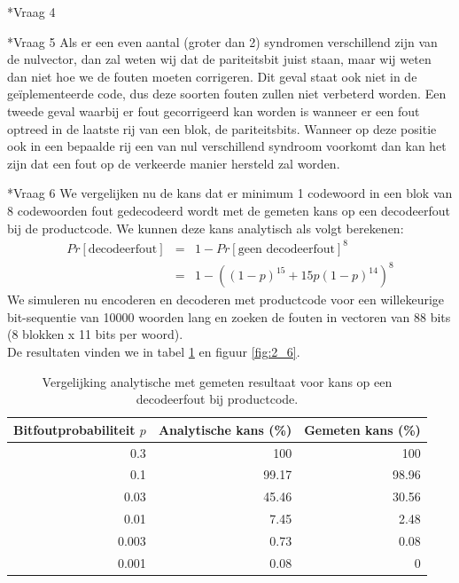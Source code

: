 \documentclass[]{article}
\begin{document}
\begin{section}
\begin{subsection}
    \end{subsection}

    \begin{subsection}*{Vraag 4} %
    \end{subsection}

    \begin{subsection}*{Vraag 5} %
    	Als er een even aantal (groter dan 2) syndromen verschillend zijn van de nulvector,
    	dan zal weten wij dat de pariteitsbit juist staan, maar wij weten dan niet hoe we
    	de fouten moeten corrigeren. Dit geval staat ook niet in de ge\"iplementeerde code,
    	dus deze soorten fouten zullen niet verbeterd worden.
    	Een tweede geval waarbij er fout gecorrigeerd kan worden is wanneer er een fout
    	optreed in de laatste rij van een blok, de pariteitsbits. Wanneer op deze positie
    	ook in een bepaalde rij een van nul verschillend syndroom voorkomt dan kan het zijn
    	dat een fout op de verkeerde manier hersteld zal worden.
    \end{subsection}

    \begin{subsection}*{Vraag 6} %
   	We vergelijken nu de kans dat er minimum 1 codewoord in een blok van 8 codewoorden fout gedecodeerd wordt met de gemeten kans op een decodeerfout bij de productcode.
	We kunnen deze kans analytisch als volgt berekenen:
    	\begin{eqnarray*}
		Pr[\text{decodeerfout}]&=& 1 - Pr[\text{geen decodeerfout}]^8 \\ 
						&=& 1 - ((1-p)^{15} + 15p(1-p)^{14})^8
	\end{eqnarray*}
	We simuleren nu encoderen en decoderen met productcode voor een willekeurige bit-sequentie van 10000 woorden lang en zoeken de fouten in vectoren van 88 bits (8 blokken x 11 bits per woord). \\ De resultaten vinden we in tabel \ref{tab:2_6} en figuur \ref{fig:2_6}.
	    	\begin{table}[h]
    		\centering	
    		\begin{tabular}{r|r|r}
    		Bitfoutprobabiliteit $p$ & Analytische kans (\%) & Gemeten kans (\%)\\
    		\hline
    		0.3 & 100 & 100 \\
        		0.1 & 99.17 & 98.96\\
    		0.03 & 45.46 & 30.56\\
    		0.01 & 7.45& 2.48\\
    		0.003 & 0.73 & 0.08 \\
    		0.001 & 0.08 & 0\\	
    		\end{tabular}
    		\caption{Vergelijking analytische met gemeten resultaat voor kans op een decodeerfout bij productcode.}
          	\label{tab:2_6}	
    	\end{table}
    

\end{subsection}
\end{section}
\end{document}
